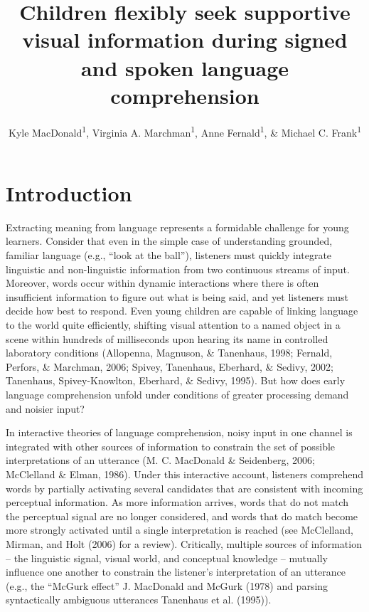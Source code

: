 \documentclass[,man,floatsintext]{apa6}
\title{Children flexibly seek supportive visual information during signed and
spoken language comprehension}
\author{Kyle MacDonald\textsuperscript{1}, Virginia A.
Marchman\textsuperscript{1}, Anne Fernald\textsuperscript{1}, \& Michael
C. Frank\textsuperscript{1}}
\date{}
\affiliation{
\vspace{0.5cm}
\textsuperscript{1} Stanford University}
\begin{document}
\maketitle

\section{Introduction}\label{introduction}

Extracting meaning from language represents a formidable challenge for
young learners. Consider that even in the simple case of understanding
grounded, familiar language (e.g., \enquote{look at the ball}),
listeners must quickly integrate linguistic and non-linguistic
information from two continuous streams of input. Moreover, words occur
within dynamic interactions where there is often insufficient
information to figure out what is being said, and yet listeners must
decide how best to respond. Even young children are capable of linking
language to the world quite efficiently, shifting visual attention to a
named object in a scene within hundreds of milliseconds upon hearing its
name in controlled laboratory conditions (Allopenna, Magnuson, \&
Tanenhaus, 1998; Fernald, Perfors, \& Marchman, 2006; Spivey, Tanenhaus,
Eberhard, \& Sedivy, 2002; Tanenhaus, Spivey-Knowlton, Eberhard, \&
Sedivy, 1995). But how does early language comprehension unfold under
conditions of greater processing demand and noisier input?

In interactive theories of language comprehension, noisy input in one
channel is integrated with other sources of information to constrain the
set of possible interpretations of an utterance (M. C. MacDonald \&
Seidenberg, 2006; McClelland \& Elman, 1986). Under this interactive
account, listeners comprehend words by partially activating several
candidates that are consistent with incoming perceptual information. As
more information arrives, words that do not match the perceptual signal
are no longer considered, and words that do match become more strongly
activated until a single interpretation is reached (see McClelland,
Mirman, and Holt (2006) for a review). Critically, multiple sources of
information -- the linguistic signal, visual world, and conceptual
knowledge -- mutually influence one another to constrain the listener's
interpretation of an utterance (e.g., the \enquote{McGurk effect} J.
MacDonald and McGurk (1978) and parsing syntactically ambiguous
utterances Tanenhaus et al. (1995)).
\end{document}
